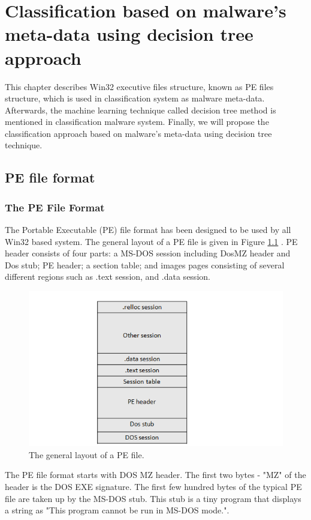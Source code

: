 \chapter{Classification based on malware's meta-data using decision tree approach}\label{chap:4}
%
%
This chapter describes Win32 executive files structure, known as PE files structure, which is used in classification system as malware meta-data. Afterwards, the machine learning technique called decision tree method is mentioned in classification malware system. Finally, we will propose the classification approach based on malware's meta-data using decision tree technique. 

\section{PE file format\cite{peheaderci}}
\subsection{The PE File Format}

The Portable Executable (PE) file format has been designed to be used by all Win32 based system. The general layout of a PE file is given in Figure \ref{fig:pefiles} . PE header consists of four parts: a MS-DOS session including DosMZ header and Dos stub; PE header; a section table; and images pages consisting of several different regions such as .text session, and .data session.
\begin{figure}[h!]
\centering
\includegraphics[width=1\textwidth]{graph/pefiles.png}
\caption{The general layout of a PE file.}
\label{fig:pefiles}
\end{figure}

The PE file format starts with DOS MZ header. The first two bytes - "MZ" of the header is the DOS EXE signature. The first few hundred bytes of the typical PE file are taken up by the MS-DOS stub. This stub is a tiny program that displays a string as "This program cannot be run in MS-DOS mode.". 

